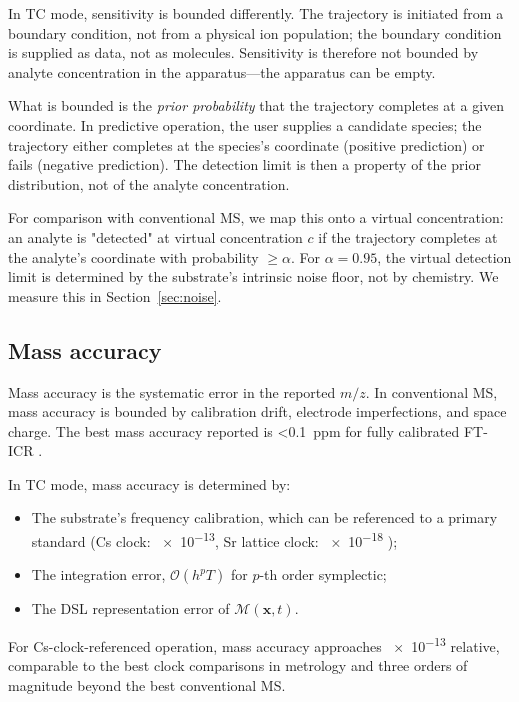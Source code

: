 \documentclass[twocolumn,11pt,a4paper]{article}
\theoremstyle{definition}
\theoremstyle{remark}
\newcommand{\Depth}{\mathcal{M}}
\begin{document}
In TC mode, sensitivity is bounded differently. The trajectory is initiated from a boundary condition, not from a physical ion population; the boundary condition is supplied as data, not as molecules. Sensitivity is therefore not bounded by analyte concentration in the apparatus---the apparatus can be empty.

What is bounded is the \emph{prior probability} that the trajectory completes at a given coordinate. In predictive operation, the user supplies a candidate species; the trajectory either completes at the species's coordinate (positive prediction) or fails (negative prediction). The detection limit is then a property of the prior distribution, not of the analyte concentration.

For comparison with conventional MS, we map this onto a virtual concentration: an analyte is "detected" at virtual concentration $c$ if the trajectory completes at the analyte's coordinate with probability $\ge \alpha$. For $\alpha = 0.95$, the virtual detection limit is determined by the substrate's intrinsic noise floor, not by chemistry. We measure this in Section~\ref{sec:noise}.

\subsection{Mass accuracy}

Mass accuracy is the systematic error in the reported $m/z$. In conventional MS, mass accuracy is bounded by calibration drift, electrode imperfections, and space charge. The best mass accuracy reported is \SI{<0.1}{ppm} for fully calibrated FT-ICR \citep{marshall2005}.

In TC mode, mass accuracy is determined by:
\begin{itemize}[nosep]
    \item The substrate's frequency calibration, which can be referenced to a primary standard (Cs clock: \num{e-13}, Sr lattice clock: \num{e-18} \citep{ludlow2015});
    \item The integration error, $\mathcal{O}(h^p T)$ for $p$-th order symplectic;
    \item The DSL representation error of $\Depth(\mathbf{x},t)$.
\end{itemize}

For Cs-clock-referenced operation, mass accuracy approaches \num{e-13} relative, comparable to the best clock comparisons in metrology and three orders of magnitude beyond the best conventional MS.
\end{document}
